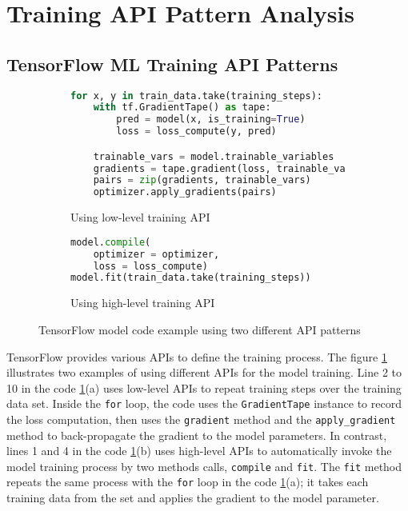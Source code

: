 \section{Training API Pattern Analysis}\label{sec:pattern}

\subsection{TensorFlow ML Training API Patterns}

\begin{figure}[ht!]
\centering
  \begin{subfigure}[b]{0.4\textwidth}
    \begin{lstlisting}[language=Python]
for x, y in train_data.take(training_steps):
    with tf.GradientTape() as tape:
        pred = model(x, is_training=True)
        loss = loss_compute(y, pred)

    trainable_vars = model.trainable_variables
    gradients = tape.gradient(loss, trainable_vars)
    pairs = zip(gradients, trainable_vars)
    optimizer.apply_gradients(pairs) 
    \end{lstlisting}
    \caption{Using low-level training API}
  \end{subfigure}
  \hspace{5mm}
  \begin{subfigure}[b]{0.45\textwidth}
    \begin{lstlisting}[language=Python]
model.compile(
    optimizer = optimizer, 
    loss = loss_compute) 
model.fit(train_data.take(training_steps))
    \end{lstlisting} 
    \caption{Using high-level training API}
  \end{subfigure}

  \caption{TensorFlow model code example using two different API patterns}
  \label{fig:pattern:ex01}
\end{figure}

TensorFlow provides various APIs to define the training process.
The figure \ref{fig:pattern:ex01} illustrates two examples of using 
different APIs for the model training.
Line 2 to 10 in the code \ref{fig:pattern:ex01}(a)  
uses low-level APIs to repeat training steps over the training
data set. Inside the {\tt for} loop, 
the code uses the {\tt GradientTape} instance to record the loss computation,
then uses the {\tt gradient} method and the {\tt apply\_gradient} method to
back-propagate the gradient to the model parameters.
In contrast, lines 1 and 4 in the code \ref{fig:pattern:ex01}(b)
uses high-level APIs to automatically
invoke the model training process by two methods calls, {\tt compile} and
{\tt fit}. The {\tt fit} method repeats the same process with the {\tt for}
loop in the code \ref{fig:pattern:ex01}(a); it takes each training data from the set and
applies the gradient to the model parameter.


